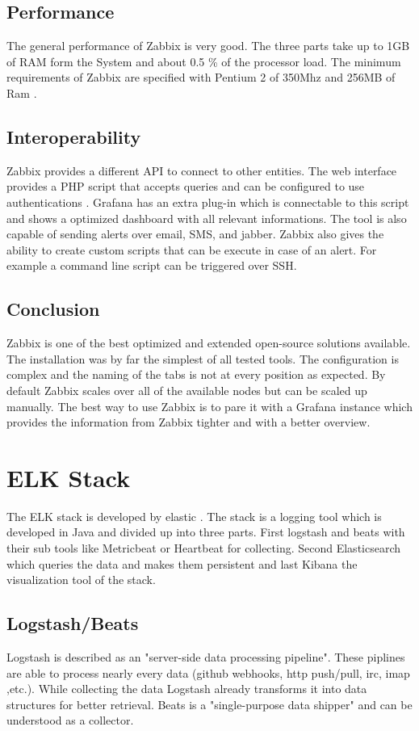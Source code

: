 \subsection{Performance}
The general performance of Zabbix is very good. The three parts take up to 1GB of RAM form the System and about 0.5 \% of the processor load. The minimum requirements of Zabbix are specified with Pentium 2 of 350Mhz and 256MB of Ram \cite{Marik2014}.
\subsection{Interoperability}
Zabbix provides a different API to connect to other entities. The web interface  provides a PHP script that accepts queries and can be configured to use authentications . Grafana has an extra plug-in which is connectable to this script and shows a optimized dashboard with all relevant informations. The tool is also capable of sending alerts over email, SMS, and jabber. Zabbix also gives the ability to create custom scripts that  can be execute in case of an alert. For example a command line script can be triggered over SSH. 
\subsection{Conclusion}
Zabbix is one of the best optimized and extended open-source solutions available. The installation was by far the simplest of all tested tools. The configuration is complex and the naming of the tabs is not at every position as expected. By default Zabbix scales over all of the available nodes but can be scaled up manually. The best way to use Zabbix is to pare it with a Grafana instance which provides the information from Zabbix tighter and with a better overview.

\section{ELK Stack}
\label{elk} %
The ELK stack is developed by elastic \cite{elasticsearch}. 
The stack is a logging tool which is developed in Java and divided up into three parts. First  logstash and beats with their sub tools like Metricbeat or Heartbeat for collecting. Second Elasticsearch which queries the data and makes them persistent and last Kibana the visualization tool of the stack.
\subsection{Logstash/Beats}
Logstash is described as an 
"server-side data processing pipeline"\cite{elasticsearch}. These piplines are able to process nearly every data (github webhooks, http push/pull, irc, imap ,etc.).
While collecting the data Logstash already transforms it into data structures for better retrieval.
Beats is a "single-purpose data shipper"\cite{elasticsearch} and can be understood as a collector.
